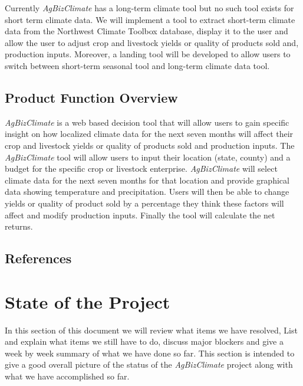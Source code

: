 \documentclass[onecolumn, draftclsnofoot,10pt, compsoc]{article}
\begin{document}
			Currently \textit{AgBizClimate} has a long-term climate tool but no such tool exists for short term climate data. We will implement a tool to extract short-term climate data from the Northwest Climate Toolbox database, display it to the user and allow the user to adjust crop and livestock yields or quality of products sold and, production inputs. Moreover, a landing tool will be developed to allow users to switch between short-term seasonal tool and long-term climate data tool.\\
			
		\subsection{Product Function Overview}
		    \textit{AgBizClimate} is a web based decision tool that will allow users to gain specific insight on how localized climate data for the next seven months will affect their crop and livestock yields or quality of products sold and production inputs. The \textit{AgBizClimate} tool will allow users to input their location (state, county) and a budget for the specific crop or livestock enterprise. \textit{AgBizClimate} will select climate data for the next seven months for that location and provide graphical data showing temperature and precipitation. Users will then be able to change yields or quality of product sold by a percentage they think these factors will affect and modify production inputs. Finally the tool will calculate the net returns.\\
		    
		\renewcommand\refname{\vskip -1cm}
		\subsection{References}

		    \nocite{*}
            
            
            

\section{State of the Project}
    In this section of this document we will review what items we have resolved, List and explain what items we still have to do, discuss major blockers and give a week by week summary of what we have done so far. This section is intended to give a good overall picture of the status of the \textit{AgBizClimate} project along with what we have accomplished so far.\\
\end{document}
